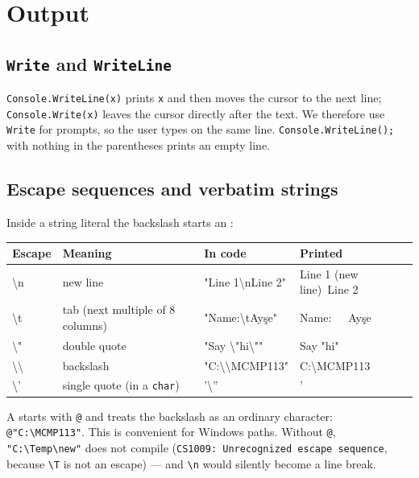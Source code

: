 \section{Output}\label{sec:output}

\subsection{\texttt{Write} and \texttt{WriteLine}}
\texttt{Console.WriteLine(x)} prints \texttt{x} and then moves the cursor to the next line; \texttt{Console.Write(x)} leaves the cursor directly after the text. We therefore use \texttt{Write} for prompts, so the user types on the same line. \texttt{Console.WriteLine();} with nothing in the parentheses prints an empty line.

\subsection{Escape sequences and verbatim strings}
Inside a string literal the backslash starts an :
\begin{center}\small
\begin{tabular}{>{\ttfamily}l l >{\ttfamily}l >{\ttfamily}l}
\toprule
\normalfont\textbf{Escape} & \textbf{Meaning} & \normalfont\textbf{In code} & \normalfont\textbf{Printed}\\ \midrule
\textbackslash n & new line & "Line 1\textbackslash nLine 2" & Line 1 \normalfont(new line)\ttfamily\ Line 2\\
\textbackslash t & tab (next multiple of 8 columns) & "Name:\textbackslash tAyşe" & Name:\ \ \ Ayşe\\
\textbackslash " & double quote & "Say \textbackslash "hi\textbackslash "" & Say "hi"\\
\textbackslash\textbackslash & backslash & "C:\textbackslash\textbackslash MCMP113" & C:\textbackslash MCMP113\\
\textbackslash ' & single quote (in a \texttt{char}) & '\textbackslash '' & '\\ \bottomrule
\end{tabular}
\end{center}
A  starts with \texttt{@} and treats the backslash as an ordinary character: \texttt{@"C:\textbackslash MCMP113"}. This is convenient for Windows paths. Without \texttt{@}, \texttt{"C:\textbackslash Temp\textbackslash new"} does not compile (\texttt{CS1009: Unrecognized escape sequence}, because \texttt{\textbackslash T} is not an escape) --- and \texttt{\textbackslash n} would silently become a line break.

